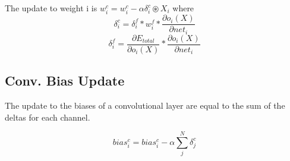 \documentclass[12pt]{article}
\begin{document}
The update to weight i is $w_i^c = w_i^c - \alpha \delta_i^c \circledast X_i$ where
$$
\delta_i^c = \delta_i^f * w_i^f * \frac{\partial o_i(X)}{\partial net_i}
$$
$$
\delta_i^f = \frac{\partial E_{total}}{\partial o_i(X)} * \frac{\partial o_i(X)}{\partial net_i}
$$

\subsection{Conv. Bias Update}

The update to the biases of a convolutional layer are equal to the sum of the deltas for each channel.

$$
bias_i^c = bias_i^c - \alpha \sum_j^N \delta_j^c
$$


\end{document}
